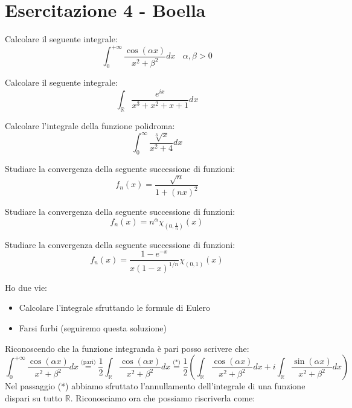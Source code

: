 \chapter{Esercitazione 4 - Boella}
\ParteEsercizi
\Esercizio{}

Calcolare il seguente integrale:
\begin{equation*}
\int ^{+\infty }_{0}\frac{\cos (\alpha x)}{x^{2} +\beta ^{2}} dx\ \ \ \ \alpha ,\beta  >0
\end{equation*}
\Esercizio{}

Calcolare il seguente integrale:
\begin{equation*}
\int _{\mathbb{R}}\frac{e^{ix}}{x^{3} +x^{2} +x+1} dx
\end{equation*}
\Esercizio{}

Calcolare l'integrale della funzione polidroma:
\begin{equation*}
\int ^{\infty }_{0}\frac{\sqrt[3]{x}}{x^{2} +4} dx
\end{equation*}
\Esercizio{}

Studiare la convergenza della seguente successione di funzioni:
\begin{equation*}
f_{n} (x)=\frac{\sqrt{n}}{1+(nx)^{2}}
\end{equation*}
\Esercizio{}

Studiare la convergenza della seguente successione di funzioni:
\begin{equation*}
f_{n} (x)=n^{\alpha } \chi _{\left( 0,\frac{1}{n}\right)} (x)
\end{equation*}
\Esercizio{}

Studiare la convergenza della seguente successione di funzioni:
\begin{equation*}
f_{n} (x)=\frac{1-e^{-x}}{x( 1-x)^{1/n}} \chi _{( 0,1)} (x)
\end{equation*}
\ParteSoluzioni
\Soluzione

Ho due vie:
\begin{itemize}
\item Calcolare l'integrale sfruttando le formule di Eulero
\item Farsi furbi (seguiremo questa soluzione)
\end{itemize}

Riconoscendo che la funzione integranda è pari posso scrivere che:
\begin{equation*}
\int ^{+\infty }_{0}\frac{\cos (\alpha x)}{x^{2} +\beta ^{2}} dx\overset{\text{(pari)}}{=}\frac{1}{2}\int _{\mathbb{R}}\frac{\cos (\alpha x)}{x^{2} +\beta ^{2}} dx\overset{\text{(*)}}{=}\frac{1}{2}\left(\int _{\mathbb{R}}\frac{\cos (\alpha x)}{x^{2} +\beta ^{2}} dx+i\int _{\mathbb{R}}\frac{\sin (\alpha x)}{x^{2} +\beta ^{2}} dx\right)
\end{equation*}
Nel passaggio (*) abbiamo sfruttato l'annullamento dell'integrale di una funzione dispari su tutto $\mathbb{R}$. Riconosciamo ora che possiamo riscriverla come:

